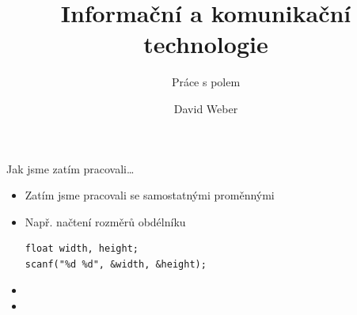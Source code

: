 \documentclass[14pt,aspectratio=169]{beamer}
\title{Informační a komunikační technologie}
\subtitle{Práce s polem}
\author{David Weber}
\begin{document}

    \begin{frame}
        \titlepage
    \end{frame}

    \begin{frame}[t,fragile]{Jak jsme zatím pracovali\dots}
        \begin{itemize}
            \item Zatím jsme pracovali se samostatnými proměnnými
            \item Např. načtení rozměrů obdélníku
            \begin{lstlisting}
float width, height;
scanf("%d %d", &width, &height);
            \end{lstlisting}
            \item {} 
            \item {} 
        \end{itemize}
    \end{frame}
\end{document}
